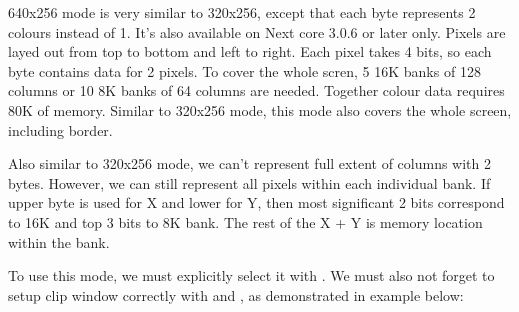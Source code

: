 \documentclass[12pt,twoside,openright,a4paper]{book}
\begin{document}
640x256 mode is very similar to 320x256, except that each byte represents 2 colours instead of 1. It's also available on Next core 3.0.6 or later only. Pixels are layed out from top to bottom and left to right. Each pixel takes 4 bits, so each byte contains data for 2 pixels. To cover the whole scren, 5 16K banks of 128 columns or 10 8K banks of 64 columns are needed. Together colour data requires 80K of memory. Similar to 320x256 mode, this mode also covers the whole screen, including border.

Also similar to 320x256 mode, we can't represent full extent of columns with 2 bytes. However, we can still represent all pixels within each individual bank. If upper byte is used for X and lower for Y, then most significant 2 bits correspond to 16K and top 3 bits to 8K bank. The rest of the X + Y is memory location within the bank.

To use this mode, we must explicitly select it with . We must also not forget to setup clip window correctly with  and , as demonstrated in example below:
\end{document}
